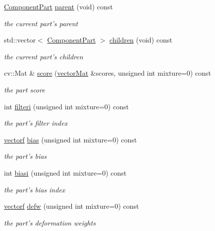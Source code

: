 \begin{DoxyCompactItemize}
\hyperlink{classComponentPart}{\-Component\-Part} \hyperlink{classComponentPart_a563956730a05cb34cc41278b6df1fa81}{parent} (void) const 
\begin{DoxyCompactList}\small\item\em the current part's parent \end{DoxyCompactList}\item 
std\-::vector$<$ \hyperlink{classComponentPart}{\-Component\-Part} $>$ \hyperlink{classComponentPart_acfa581b85329b7bf7eb4d10c2552db57}{children} (void) const 
\begin{DoxyCompactList}\small\item\em the current part's children \end{DoxyCompactList}\item 
cv\-::\-Mat \& \hyperlink{classComponentPart_a91d932065c3d5966282454c3ccde1171}{score} (\hyperlink{types_8hpp_a3207a7addcfa415d1c83622febcb1e9b}{vector\-Mat} \&scores, unsigned int mixture=0) const 
\begin{DoxyCompactList}\small\item\em the part score \end{DoxyCompactList}\item 
int \hyperlink{classComponentPart_a1a64f4ea97a74e67976c6132fa5b6709}{filteri} (unsigned int mixture=0) const 
\begin{DoxyCompactList}\small\item\em the part's filter index \end{DoxyCompactList}\item 
\hyperlink{types_8hpp_a4da5db3ee9e284f719ef5764dbadffc8}{vectorf} \hyperlink{classComponentPart_aceb613ee5301c45f64fbaec6790d6255}{bias} (unsigned int mixture=0) const 
\begin{DoxyCompactList}\small\item\em the part's bias \end{DoxyCompactList}\item 
int \hyperlink{classComponentPart_a60e06d1300f0f1254d779b1b559dddbb}{biasi} (unsigned int mixture=0) const 
\begin{DoxyCompactList}\small\item\em the part's bias index \end{DoxyCompactList}\item 
\hyperlink{types_8hpp_a4da5db3ee9e284f719ef5764dbadffc8}{vectorf} \hyperlink{classComponentPart_a6ef3b7d97b9218fee5e74ff7c9a25837}{defw} (unsigned int mixture=0) const 
\begin{DoxyCompactList}\small\item\em the part's deformation weights \end{DoxyCompactList}\item 

\end{DoxyCompactItemize}
